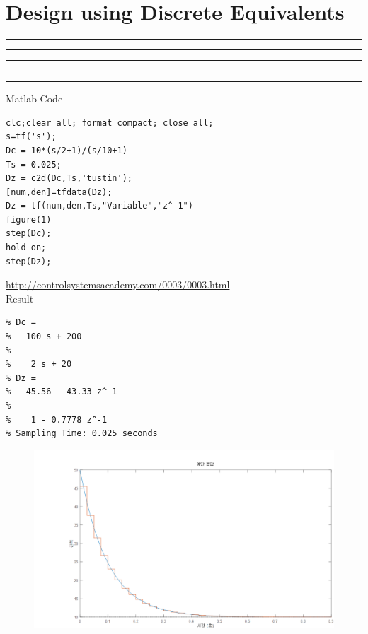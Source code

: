 \setcounter{chapter}{7}
\setcounter{section}{2}
\section{Design using Discrete Equivalents}
\vspace{-8pt} \hrule \hrule \hrule \hrule \hrule  \vspace{12pt}
Matlab Code
\begin{lstlisting}
clc;clear all; format compact; close all;
s=tf('s');
Dc = 10*(s/2+1)/(s/10+1)
Ts = 0.025;
Dz = c2d(Dc,Ts,'tustin');
[num,den]=tfdata(Dz);
Dz = tf(num,den,Ts,"Variable","z^-1")
figure(1)
step(Dc);
hold on;
step(Dz);
\end{lstlisting}
\url{http://controlsystemsacademy.com/0003/0003.html}\\
Result
\begin{lstlisting}
% Dc =
%   100 s + 200
%   -----------
%    2 s + 20
% Dz =
%   45.56 - 43.33 z^-1
%   ------------------
%    1 - 0.7778 z^-1
% Sampling Time: 0.025 seconds
\end{lstlisting}
\newpage
\begin{figure}[h]
	\centering
	\includegraphics[width=20cm]{./FIG_Franklin/fig8-smc6.png}
\end{figure}